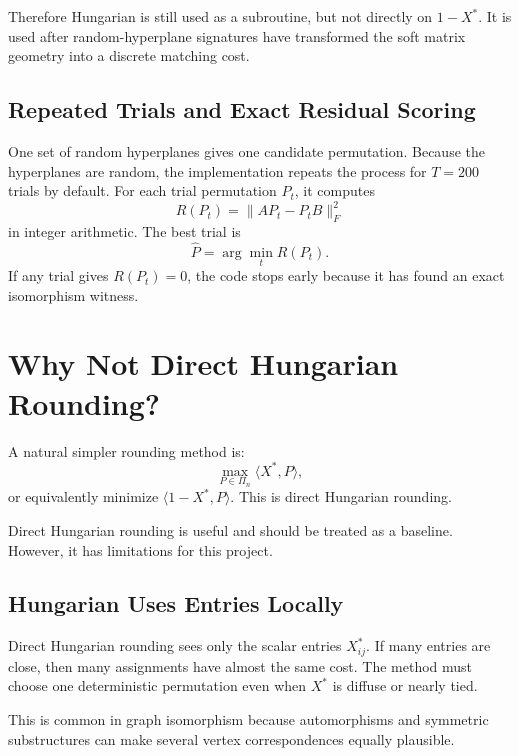 \documentclass[11pt]{article}
\begin{document}
Therefore Hungarian is still used as a subroutine, but not directly on
$1-X^*$.
It is used after random-hyperplane signatures have transformed the soft matrix
geometry into a discrete matching cost.

\subsection{Repeated Trials and Exact Residual Scoring}

One set of random hyperplanes gives one candidate permutation.
Because the hyperplanes are random, the implementation repeats the process for
$T=200$ trials by default.
For each trial permutation $P_t$, it computes
\begin{equation}
    R(P_t)=\|AP_t-P_tB\|_F^2
\end{equation}
in integer arithmetic.
The best trial is
\begin{equation}
    \hat P = \arg\min_t R(P_t).
\end{equation}
If any trial gives $R(P_t)=0$, the code stops early because it has found an
exact isomorphism witness.

\section{Why Not Direct Hungarian Rounding?}

A natural simpler rounding method is:
\begin{equation}
    \max_{P\in\Pi_n} \langle X^*,P\rangle,
\end{equation}
or equivalently minimize $\langle 1-X^*,P\rangle$.
This is direct Hungarian rounding.

Direct Hungarian rounding is useful and should be treated as a baseline.
However, it has limitations for this project.

\subsection{Hungarian Uses Entries Locally}

Direct Hungarian rounding sees only the scalar entries $X^*_{ij}$.
If many entries are close, then many assignments have almost the same cost.
The method must choose one deterministic permutation even when $X^*$ is
diffuse or nearly tied.

This is common in graph isomorphism because automorphisms and symmetric
substructures can make several vertex correspondences equally plausible.
\end{document}
